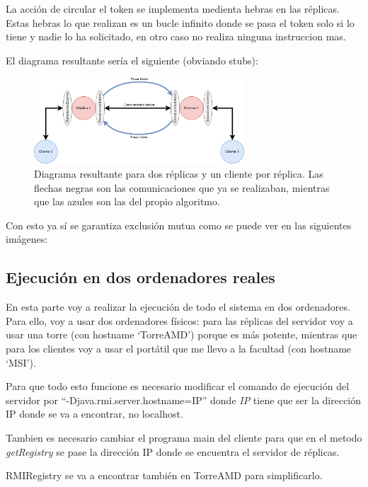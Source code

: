 \documentclass{article}
\begin{document}
La acción de circular el token se implementa medienta hebras en las réplicas. Estas hebras lo que realizan es un bucle infinito donde se pasa el token solo si lo tiene y nadie lo ha solicitado, en otro caso no realiza ninguna instruccion mas.

El diagrama resultante sería el siguiente (obviando stubs):

\begin{figure}[H]
    \centering
    \includegraphics[width=0.7\textwidth]{imagenes/diagramaAnillo.png}
    \caption{Diagrama resultante para dos réplicas y un cliente por réplica. Las flechas negras son las comunicaciones que ya se realizaban, mientras que las azules son las del propio algoritmo.}
\end{figure}

Con esto ya sí se garantiza exclusión mutua como se puede ver en las siguientes imágenes:


\subsection{Ejecución en dos ordenadores reales}
En esta parte voy a realizar la ejecución de todo el sistema en dos ordenadores. Para ello, voy a usar dos ordenadores físicos: para las réplicas del servidor voy a usar una torre (con hostname `TorreAMD') porque es más potente, mientras que para los clientes voy a usar el portátil que me llevo a la facultad (con hostname `MSI').

Para que todo esto funcione es necesario modificar el comando de ejecución del servidor por ``-Djava.rmi.server.hostname=IP'' donde \textit{IP} tiene que ser la dirección IP donde se va a encontrar, no localhost.

Tambien es necesario cambiar el programa main del cliente para que en el metodo \textit{getRegistry} se pase la dirección IP donde se encuentra el servidor de réplicas.

RMIRegistry se va a encontrar también en TorreAMD para simplificarlo.
\end{document}
